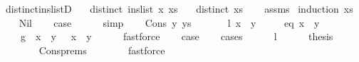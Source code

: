 \begin{isabellebody}
\endisatagproof
{\isafoldproof}%
%
\isadelimproof
%
\endisadelimproof
%
\isadelimdocument
%
\endisadelimdocument
%
\isatagdocument
%
\isamarkuptrue%
%
\endisatagdocument
{\isafolddocument}%
%
\isadelimdocument
%
\endisadelimdocument
{}\isamarkupfalse%
\ distinct{\isacharunderscore}{\kern0pt}ins{\isacharunderscore}{\kern0pt}listD{\isacharcolon}{\kern0pt}\isanewline
\ \ \ {\isachardoublequoteopen}distinct\ {\isacharparenleft}{\kern0pt}ins{\isacharunderscore}{\kern0pt}list\ x\ xs{\isacharparenright}{\kern0pt}{\isachardoublequoteclose}\isanewline
\ \ \ {\isachardoublequoteopen}distinct\ xs{\isachardoublequoteclose}\isanewline
%
\isadelimproof
\ \ %
\endisadelimproof
%
\isatagproof
{}\isamarkupfalse%
\ assms\isanewline
{}\isamarkupfalse%
\ {\isacharparenleft}{\kern0pt}induction\ xs{\isacharparenright}{\kern0pt}\isanewline
\ \ \isamarkupfalse%
\ Nil\isanewline
\ \ \isamarkupfalse%
\ {\isacharquery}{\kern0pt}case\isanewline
\ \ \ \ \isamarkupfalse%
\ simp\isanewline
{}\isamarkupfalse%
\isanewline
\ \ \isamarkupfalse%
\ {\isacharparenleft}{\kern0pt}Cons\ y\ ys{\isacharparenright}{\kern0pt}\isanewline
\ \ \isamarkupfalse%
\isanewline
\ \ \ \ {\isacharparenleft}{\kern0pt}l{\isacharparenright}{\kern0pt}\ {\isachardoublequoteopen}x\ {\isacharless}{\kern0pt}\ y{\isachardoublequoteclose}\ {\isacharbar}{\kern0pt}\isanewline
\ \ \ \ {\isacharparenleft}{\kern0pt}eq{\isacharparenright}{\kern0pt}\ {\isachardoublequoteopen}x\ {\isacharequal}{\kern0pt}\ y{\isachardoublequoteclose}\ {\isacharbar}{\kern0pt}\isanewline
\ \ \ \ {\isacharparenleft}{\kern0pt}g{\isacharparenright}{\kern0pt}\ {\isachardoublequoteopen}{\isasymnot}\ x\ {\isacharless}{\kern0pt}\ y\ {\isasymand}\ {\isasymnot}\ x\ {\isacharequal}{\kern0pt}\ y{\isachardoublequoteclose}\isanewline
\ \ \ \ \isamarkupfalse%
\ fastforce\isanewline
\ \ \isamarkupfalse%
\ {\isacharquery}{\kern0pt}case\isanewline
\ \ \isamarkupfalse%
\ {\isacharparenleft}{\kern0pt}cases{\isacharparenright}{\kern0pt}\isanewline
\ \ \ \ \isamarkupfalse%
\ l\isanewline
\ \ \ \ \isamarkupfalse%
\ {\isacharquery}{\kern0pt}thesis\isanewline
\ \ \ \ \ \ \isamarkupfalse%
\ Cons{\isachardot}{\kern0pt}prems\isanewline
\ \ \ \ \ \ \isamarkupfalse%
\ fastforce\isanewline
\ \ \isamarkupfalse%
\isanewline

\end{isabellebody}
